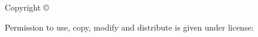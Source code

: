 \def\makecopyrightpage{\clearpage\null\vfill
\thispagestyle{empty}
\begin{minipage}[b]{0.9\textwidth}
\footnotesize\raggedright
\setlength{\parskip}{0.5\baselineskip}
Copyright \copyright \the\year\ \theauthor\par
\doclicenseThis


Permission to use, copy, modify and distribute is given under \doclicenseLongType license:
\doclicenseURL
\end{minipage}
\vspace*{2\baselineskip}
\cleardoublepage
}
\makecopyrightpage